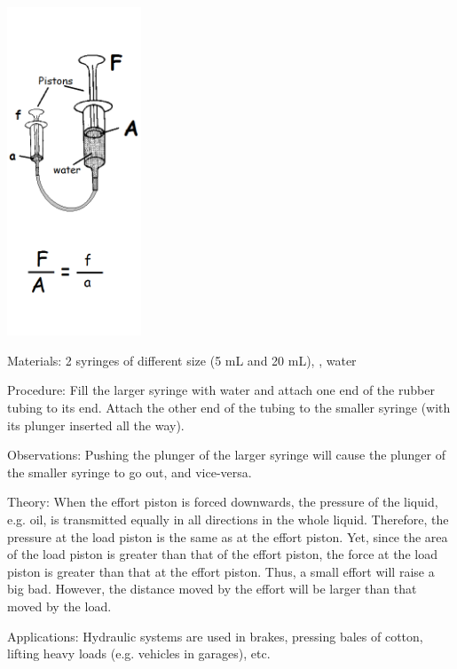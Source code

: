 \begin{multicols}{2}
\begin{center}
\includegraphics[width=0.3\textwidth]{./img/source/hydraulic-press-2.png}
\end{center}

\begin{description*}
\item[Materials:]{2 syringes of different size (5 mL and 20 mL), , water}
\item[Procedure:]{Fill the larger syringe with water and attach one end of the rubber tubing to its end. Attach the other end of the tubing to the smaller syringe (with its plunger inserted all the way).}
\item[Observations:]{Pushing the plunger of the larger syringe will cause the plunger of the smaller syringe to go out, and vice-versa.}
\item[Theory:]{When the effort piston is forced downwards, the pressure of the liquid, e.g. oil, is transmitted
equally in all directions in the whole liquid.
Therefore, the pressure at the load piston is the same as at the effort piston. Yet,
since the area of the load piston is greater than that of the effort
piston, the force at the load piston is greater than that at the effort piston. Thus, a small effort
will raise a big bad. However, the distance moved by the effort will be larger than that moved
by the load.}
\item[Applications:]{Hydraulic systems are used in brakes, pressing bales of cotton, lifting heavy loads (e.g.
vehicles in garages), etc.}
\end{description*}



\end{multicols}

\pagebreak